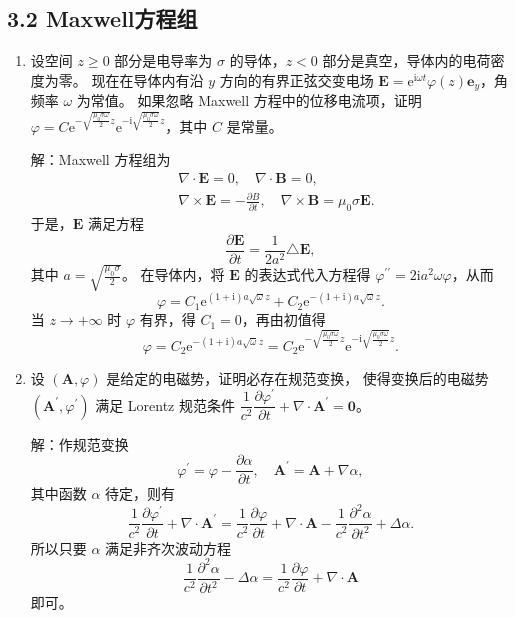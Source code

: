 \subsection{3.2 Maxwell方程组}
\begin{enumerate}
\item 设空间 $z \geqslant 0$ 部分是电导率为 $\sigma$ 的导体，$z<0$ 部分是真空，导体内的电荷密度为零。
现在在导体内有沿 $y$ 方向的有界正弦交变电场 $\boldsymbol{E}=\mathrm{e}^{\mathrm{i} \omega t} \varphi(z) \boldsymbol{e}_y$，角频率 $\omega$ 为常值。
如果忽略 Maxwell 方程中的位移电流项，证明 $\varphi=C \mathrm{e}^{-\sqrt{\frac{\mu_0 \sigma \omega}{2}} z} \mathrm{e}^{-\mathrm{i} \sqrt{\frac{\mu_0 \sigma \omega}{2}} z}$，其中 $C$ 是常量。

解：Maxwell 方程组为
\begin{align*}
& \nabla \cdot \boldsymbol{E}=0, \quad \nabla \cdot \boldsymbol{B}=0, \\
& \nabla \times \boldsymbol{E}=-\frac{\partial B}{\partial t}, 
\quad \nabla \times \boldsymbol{B}=\mu_{0} \sigma \boldsymbol{E}.
\end{align*}
于是，$\boldsymbol{E}$ 满足方程
\[\frac{\partial \boldsymbol{E}}{\partial t}=\frac{1}{2a^{2}} \triangle \boldsymbol{E},\]
其中 $a=\sqrt{\frac{\mu_{0} \sigma}{2}}$。
在导体内，将 $\boldsymbol{E}$ 的表达式代入方程得 $\varphi^{\prime \prime}=2\mathrm{i}a^{2}\omega\varphi$，从而
\[\varphi=C_{1}\mathrm{e}^{(1+\mathrm{i})a\sqrt{\omega}z}+C_{2}\mathrm{e}^{-(1+\mathrm{i})a\sqrt{\omega}z}.\]
当 $z \rightarrow+\infty$ 时 $\varphi$ 有界，得 $C_{1}=0$，再由初值得
\[\varphi=C_{2}\mathrm{e}^{-(1+\mathrm{i})a\sqrt{\omega}z}
=C_{2}\mathrm{e}^{-\sqrt{\frac{\mu_{0}\sigma\omega}{2}}z} 
\mathrm{e}^{-\mathrm{i}\sqrt{\frac{\mu_{0}\sigma\omega}{2}}z}.\]

\item 设 $(\boldsymbol{A}, \varphi)$ 是给定的电磁势，证明必存在规范变换，
使得变换后的电磁势 $(\boldsymbol{A}^{\prime}, \varphi^{\prime})$ 满足 Lorentz 规范条件 
$\dfrac{1}{c^2} \dfrac{\partial \varphi^{\prime}}{\partial t}+\nabla \cdot \boldsymbol{A}^{\prime}=\mathbf{0}$。

解：作规范变换
\[\varphi^{\prime}=\varphi-\frac{\partial \alpha}{\partial t}, 
\quad \boldsymbol{A}^{\prime}=\boldsymbol{A}+\nabla \alpha,\]
其中函数 $\alpha$ 待定，则有
$$\frac{1}{c^{2}} \frac{\partial \varphi^{\prime}}{\partial t}+\nabla \cdot \boldsymbol{A}^{\prime}
=\frac{1}{c^{2}} \frac{\partial \varphi}{\partial t}+\nabla \cdot \boldsymbol{A}-\frac{1}{c^{2}} \frac{\partial^{2} \alpha}{\partial t^{2}}+\Delta \alpha.$$
所以只要 $\alpha$ 满足非齐次波动方程
$$\frac{1}{c^{2}} \frac{\partial^{2} \alpha}{\partial t^{2}}-\Delta \alpha
=\frac{1}{c^{2}} \frac{\partial \varphi}{\partial t}+\nabla \cdot \boldsymbol{A}$$
即可。


\end{enumerate}
